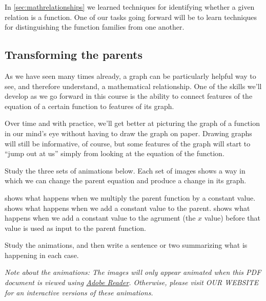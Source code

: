 In \cref{sec:mathrelationships} we learned techniques for identifying whether a given relation is a function. One of our tasks going forward will be to learn techniques for distinguishing the function families from one another.


\subsection{Transforming the parents}

As we have seen many times already, a graph can be particularly helpful way to see, and therefore understand, a mathematical relationship. One of the skills we'll develop as we go forward in this course is the ability to connect features of the equation of a certain function to features of its graph.

Over time and with practice, we'll get better at picturing the graph of a function in our mind's eye without having to draw the graph on paper. Drawing graphs will still be informative, of course, but some features of the graph will start to ``jump out at us'' simply from looking at the equation of the function.

\begin{boxedexplore}
Study the three sets of animations below. Each set of images shows a way in which we can change the parent equation and produce a change in its graph.

 shows what happens when we multiply the parent function by a constant value.  shows what happens when we add a constant value to the parent.  shows what happens when we add a constant value to the agrument (the $x$ value) before that value is used as input to the parent function.

Study the animations, and then write a sentence or two summarizing what is happening in each case.

\textit{Note about the animations: The images will only appear animated when this PDF document is viewed using \href{http://get.adobe.com/reader/}{Adobe Reader}. Otherwise, please visit OUR WEBSITE for an interactive versions of these animations.}

\end{boxedexplore}

